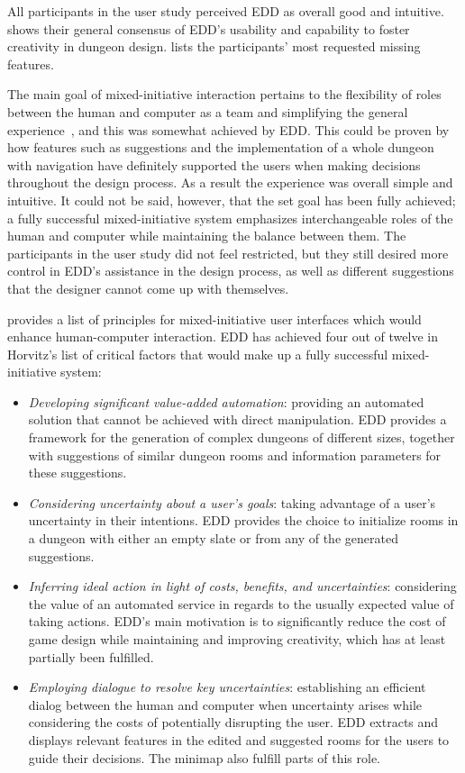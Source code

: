\documentclass[sigconf]{acmart}
\begin{document}
All participants in the user study perceived EDD as overall good and intuitive.  shows their general consensus of EDD's usability and capability to foster creativity in dungeon design.  lists the participants' most requested missing features.

The main goal of mixed-initiative interaction pertains to the flexibility of roles between the human and computer as a team and simplifying the general experience~\cite{allen1999mixed}, and this was somewhat achieved by EDD. This could be proven by how features such as suggestions and the implementation of a whole dungeon with navigation have definitely supported the users when making decisions throughout the design process. As a result the experience was overall simple and intuitive. It could not be said, however, that the set goal has been fully achieved; a fully successful mixed-initiative system emphasizes interchangeable roles of the human and computer while maintaining the balance between them. The participants in the user study did not feel restricted, but they still desired more control in EDD’s assistance in the design process, as well as different suggestions that the designer cannot come up with themselves.

\citet{horvitz1999principles} provides a list of principles for mixed-initiative user interfaces which would enhance human-computer interaction. EDD has achieved four out of twelve in Horvitz’s list of critical factors that would make up a fully successful mixed-initiative system:

\begin{itemize}
\item \textit{Developing significant value-added automation}: providing an automated solution that cannot be achieved with direct manipulation. EDD provides a framework for the generation of complex dungeons of different sizes, together with suggestions of similar dungeon rooms and information parameters for these suggestions. 
\item \textit{Considering uncertainty about a user’s goals}: taking advantage of a user’s uncertainty in their intentions. EDD provides the choice to initialize rooms in a dungeon with either an empty slate or from any of the generated suggestions.
\item \textit{Inferring ideal action in light of costs, benefits, and uncertainties}: considering the value of an automated service in regards to the usually expected value of taking actions. EDD’s main motivation is to significantly reduce the cost of game design while maintaining and improving creativity, which has at least partially been fulfilled.
\item \textit{Employing dialogue to resolve key uncertainties}: establishing an efficient dialog between the human and computer when uncertainty arises while considering the costs of potentially disrupting the user. EDD extracts and displays relevant features in the edited and suggested rooms for the users to guide their decisions. The minimap also fulfill parts of this role.
\end{itemize}
\end{document}
